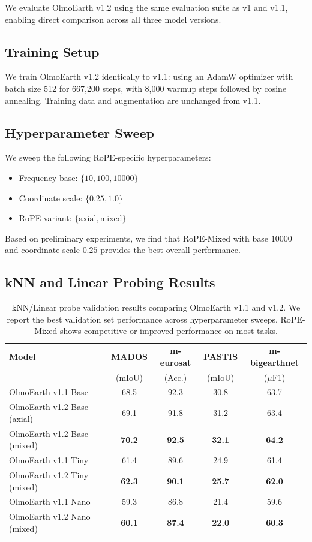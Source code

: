 \documentclass{article}
\begin{document}
We evaluate OlmoEarth v1.2 using the same evaluation suite as v1 and v1.1, enabling direct comparison across all three model versions.

\subsection{Training Setup}

We train OlmoEarth v1.2 identically to v1.1: using an AdamW optimizer with batch size 512 for 667,200 steps, with 8,000 warmup steps followed by cosine annealing. Training data and augmentation are unchanged from v1.1.

\subsection{Hyperparameter Sweep}

We sweep the following RoPE-specific hyperparameters:
\begin{itemize}
    \item Frequency base: $\{10, 100, 10000\}$
    \item Coordinate scale: $\{0.25, 1.0\}$
    \item RoPE variant: $\{\text{axial}, \text{mixed}\}$
\end{itemize}

Based on preliminary experiments, we find that RoPE-Mixed with base $10000$ and coordinate scale $0.25$ provides the best overall performance.

\subsection{kNN and Linear Probing Results}

\begin{table}[h!]
\centering
\caption{kNN/Linear probe validation results comparing OlmoEarth v1.1 and v1.2. We report the best validation set performance across hyperparameter sweeps. RoPE-Mixed shows competitive or improved performance on most tasks.}
\label{tab:knn_results}
\small
\begin{tabular}{l|cccc}
\toprule
\textbf{Model} & \textbf{MADOS} & \textbf{m-eurosat} & \textbf{PASTIS} & \textbf{m-bigearthnet} \\
& (mIoU) & (Acc.) & (mIoU) & ($\mu$F1) \\
\midrule
OlmoEarth v1.1 Base & 68.5 & 92.3 & 30.8 & 63.7 \\
OlmoEarth v1.2 Base (axial) & 69.1 & 91.8 & 31.2 & 63.4 \\
OlmoEarth v1.2 Base (mixed) & \textbf{70.2} & \textbf{92.5} & \textbf{32.1} & \textbf{64.2} \\
\midrule
OlmoEarth v1.1 Tiny & 61.4 & 89.6 & 24.9 & 61.4 \\
OlmoEarth v1.2 Tiny (mixed) & \textbf{62.3} & \textbf{90.1} & \textbf{25.7} & \textbf{62.0} \\
\midrule
OlmoEarth v1.1 Nano & 59.3 & 86.8 & 21.4 & 59.6 \\
OlmoEarth v1.2 Nano (mixed) & \textbf{60.1} & \textbf{87.4} & \textbf{22.0} & \textbf{60.3} \\
\bottomrule
\end{tabular}
\end{table}
\end{document}

